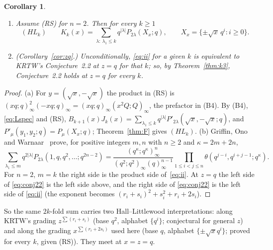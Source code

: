 \documentclass[11pt]{amsart}
\newtheorem{corollary}[theorem]{Corollary}
\theoremstyle{definition}
\numberwithin{equation}{section}
\begin{document}
\begin{corollary}\label{cor:HL}
\begin{enumerate}[label=(\alph*)]
\item Assume (RS) for $n=2$. Then for every $k\ge1$
\[
(HL_k)\qquad K_k(x)=\sum_{\lambda:\ \lambda_1\le k}q^{|\lambda|}P_{2\lambda}(X_x;q),\qquad X_x=\{\pm\sqrt x\,q^i:i\ge0\}.
\]
\item \textup{(}Corollary~\ref{cor:zq}.\textup{)} Unconditionally, \eqref{eq:ii} for a given $k$ is equivalent to
KRTW's Conjecture~2.2 at $z=q$ for that $k$; so, by Theorem~\ref{thm:k3}, Conjecture~2.2 holds at $z=q$ for every $k$.
\end{enumerate}
\end{corollary}
\begin{proof}
(a) For $y=(\sqrt x,-\sqrt x)$ the product in (RS) is $(xq;q)_\infty^2(-xq;q)_\infty=(xq;q)_\infty(x^2Q;Q)_\infty$,
the prefactor in (B4). By (B4), \eqref{eq:Lspec} and (RS),
$B_{k+1}(x)J_k(x)=\sum_{\lambda_1\le k}q^{|\lambda|}P'_{2\lambda}(\sqrt x,-\sqrt x;q)$, and
$P'_\mu(y_1,y_2;q)=P_\mu(X_x;q)$; Theorem~\ref{thm:F} gives $(HL_k)$.
(b) Griffin, Ono and Warnaar~\cite[Theorem~1.3]{GOW} prove, for positive integers $m,n$ with $n\ge2$ and
$\kappa=2m+2n$,
\[
\sum_{\lambda_1\le m}q^{2|\lambda|}P_{2\lambda}(1,q,q^2,\dots;q^{2n-2})
=\frac{(q^\kappa;q^\kappa)^n_\infty}{(q^2;q^2)_\infty(q)^{n-1}_\infty}\prod_{1\le i<j\le n}\theta(q^{j-i},q^{i+j-1};q^\kappa).
\]
For $n=2$, $m=k$ the right side is the product side of~\eqref{eq:ii}. At $z=q$ the left side of
\eqref{eq:conj22} is the left side above, and the right side of \eqref{eq:conj22} is the left side of
\eqref{eq:ii} (the exponent becomes $(r_i+s_i)^2+s_i^2+r_i+2s_i$).
\end{proof}

So the same $2k$-fold sum carries two Hall--Littlewood interpretations: along KRTW's grading
$z^{\sum(r_i+s_i)}$ (base $q^2$, alphabet $\{q^i\}$; conjectural for general $z$) and along the grading
$x^{\sum(r_i+2s_i)}$ used here (base $q$, alphabet $\{\pm\sqrt xq^i\}$; proved for every $k$, given (RS)). They
meet at $x=z=q$.
\end{document}
